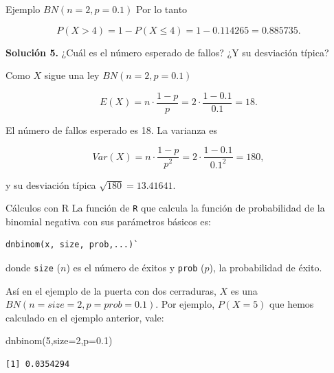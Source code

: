 \documentclass[
  ignorenonframetext,
  aspectratio=169]{beamer}
\newenvironment{Shaded}{\begin{snugshade}}{\end{snugshade}}
\newcommand{\AttributeTok}[1]{\textcolor[rgb]{0.40,0.45,0.13}{#1}}
\newcommand{\DecValTok}[1]{\textcolor[rgb]{0.68,0.00,0.00}{#1}}
\newcommand{\FloatTok}[1]{\textcolor[rgb]{0.68,0.00,0.00}{#1}}
\newcommand{\FunctionTok}[1]{\textcolor[rgb]{0.28,0.35,0.67}{#1}}
\newcommand{\NormalTok}[1]{\textcolor[rgb]{0.00,0.23,0.31}{#1}}
\begin{document}
\begin{frame}{Ejemplo \(BN(n=2,p=0.1)\)}
\protect\hypertarget{ejemplo-bnn2p0.1-4}{}
Por lo tanto

\[
P(X>4)=1-P(X\leq 4)=1-0.114265=
0.885735.
\]

\textbf{Solución 5.} ¿Cuál es el número esperado de fallos? ¿Y su
desviación típica?

Como \(X\) sigue una ley \(BN(n=2,p=0.1)\)

\[E(X)=n\cdot \frac{1-p}{p}=2\cdot \frac{1-0.1}{0.1}=18.\]

El número de fallos esperado es 18. La varianza es

\[
Var(X)=n\cdot\frac{1-p}{p^2}=2 \cdot \frac{1-0.1}{0.1^2}=180,
\]

y su desviación típica \(\sqrt{180}=13.41641.\)
\end{frame}

\begin{frame}[fragile]{Cálculos con R}
\protect\hypertarget{cuxe1lculos-con-r-2}{}
La función de \texttt{R} que calcula la función de probabilidad de la
binomial negativa con sus parámetros básicos es:

\begin{verbatim}
dnbinom(x, size, prob,...)`
\end{verbatim}

donde \texttt{size} (\(n\)) es el número de éxitos y \texttt{prob}
(\(p\)), la probabilidad de éxito.

Así en el ejemplo de la puerta con dos cerraduras, \(X\) es una
\(BN(n=size=2,p=prob=0.1)\). Por ejemplo, \(P(X=5)\) que hemos calculado
en el ejemplo anterior, vale:

\begin{Shaded}
\begin{Highlighting}[]
\FunctionTok{dnbinom}\NormalTok{(}\DecValTok{5}\NormalTok{,}\AttributeTok{size=}\DecValTok{2}\NormalTok{,}\AttributeTok{p=}\FloatTok{0.1}\NormalTok{)}
\end{Highlighting}
\end{Shaded}

\begin{verbatim}
[1] 0.0354294
\end{verbatim}
\end{frame}
\end{document}
